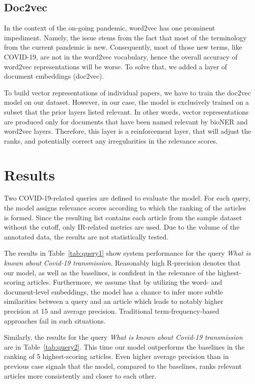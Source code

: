 \documentclass[10pt, a4paper]{article}
\begin{document}
	\subsection{Doc2vec}
	
In the context of the on-going pandemic, word2vec has one prominent impediment. Namely, the issue stems from the fact that most of the terminology from the current pandemic is new. Consequently, most of those new terms, like COVID-19, are not in the word2vec vocabulary, hence the overall accuracy of word2vec representations will be worse. To solve that, we added a layer of document embeddings (doc2vec). 

To build vector representations of individual papers, we have to train the doc2vec model on our dataset. However, in our case, the model is exclusively trained on a subset that the prior layers listed relevant. In other words, vector representations are produced only for documents that have been named relevant by bioNER and word2vec layers. Therefore, this layer is a reinforcement layer, that will adjust the ranks, and potentially correct any irregularities in the relevance scores.
	
	\section{Results}
	
	Two COVID-19-related queries are defined to evaluate the model. For each query, the model assigns relevance scores according to which the ranking of the articles is formed. Since the resulting list contains each article from the sample dataset without the cutoff, only IR-related metrics are used. Due to the volume of the annotated data, the results are not statistically tested. 
	
	The results in Table~\ref{tab:query1} show system performance for the query \textit{What is known about Covid-19 transmission}. Reasonably high R-precision denotes that our model, as well as the baselines, is confident in the relevance of the highest-scoring articles. Furthermore, we assume that by utilizing the word- and document-level embeddings, the model has a chance to infer more subtle similarities between a query and an article which leads to notably higher precision at 15 and average precision. Traditional term-frequency-based approaches fail in such situations.
	
	Similarly, the results for the query \textit{What is known about Covid-19 transmission} are in Table~\ref{tab:query2}. This time our model outperforms the baselines in the ranking of 5 highest-scoring articles. Even higher average precision than in previous case signals that the model, compared to the baselines, ranks relevant articles more consistently and closer to each other.
	
\end{document}
